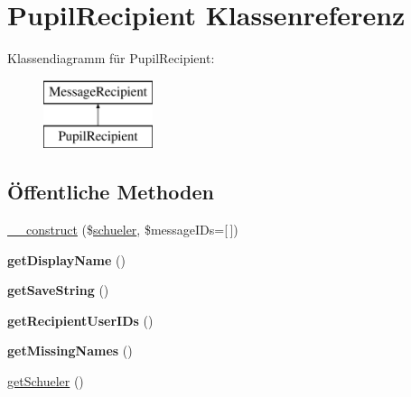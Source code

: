 \hypertarget{class_pupil_recipient}{}\section{Pupil\+Recipient Klassenreferenz}
\label{class_pupil_recipient}
Klassendiagramm für Pupil\+Recipient\+:\begin{figure}[H]
\begin{center}
\leavevmode
\includegraphics[height=2.000000cm]{class_pupil_recipient}
\end{center}
\end{figure}
\subsection*{Öffentliche Methoden}
\begin{DoxyCompactItemize}
\item 
\mbox{\hyperlink{class_pupil_recipient_aee012c08ccc819a105174089e89eb9a5}{\+\_\+\+\_\+construct}} (\$\mbox{\hyperlink{classschueler}{schueler}}, \$message\+I\+Ds=\mbox{[}$\,$\mbox{]})
\item 
\mbox{\label{class_pupil_recipient_ae96f9741ffb00279bc745fa1202a4b5b}} 
{\bfseries get\+Display\+Name} ()
\item 
\mbox{\label{class_pupil_recipient_a95e6c81790dd5909e09d6de5d66b0f42}} 
{\bfseries get\+Save\+String} ()
\item 
\mbox{\label{class_pupil_recipient_ac73f77d58d59e7260226fbb2b44ada3d}} 
{\bfseries get\+Recipient\+User\+I\+Ds} ()
\item 
\mbox{\label{class_pupil_recipient_a0c9c46a9b9ccbbb7fc476c21ef477de6}} 
{\bfseries get\+Missing\+Names} ()
\item 
\mbox{\hyperlink{class_pupil_recipient_ab7337229a1ecc5640d13a511259972f8}{get\+Schueler}} ()
\end{DoxyCompactItemize}
